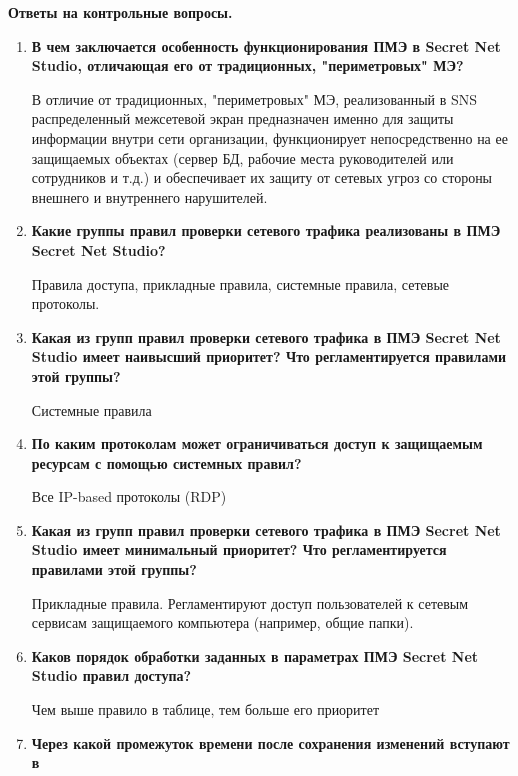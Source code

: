 \documentclass[a4paper,14pt]{extarticle}
\begin{document}
    \newpage
    \textbf{Ответы на контрольные вопросы.}
    \begin{enumerate}
        \singlespacing
        \item \textbf{В чем заключается особенность функционирования ПМЭ в Secret Net \linebreak Studio,
        отличающая его от традиционных, "периметровых" МЭ?}\par
        В отличие от традиционных, "периметровых" МЭ, реализованный в SNS \linebreak
        распределенный межсетевой экран предназначен именно для защиты \linebreak информации 
        внутри сети организации, функционирует непосредственно на ее защищаемых объектах 
        (сервер БД, рабочие места руководителей или сотрудников и т.д.) и обеспечивает 
        их защиту от сетевых угроз со стороны внешнего и внутреннего нарушителей.
        \item \textbf{Какие группы правил проверки сетевого трафика реализованы в ПМЭ Secret
        Net Studio?}\par
        Правила доступа, прикладные правила, системные правила, сетевые протоколы.
        \item \textbf{Какая из групп правил проверки сетевого трафика в ПМЭ Secret Net Studio
        имеет наивысший приоритет? Что регламентируется правилами этой \linebreak группы?}\par
        Системные правила
        \item \textbf{По каким протоколам может ограничиваться доступ к защищаемым \linebreak ресурсам
        с помощью системных правил?}\par
        Все IP-based протоколы (RDP)
        \item \textbf{Какая из групп правил проверки сетевого трафика в ПМЭ Secret Net Studio
        имеет минимальный приоритет? Что регламентируется правилами этой
        группы?}\par
        Прикладные правила. Регламентируют доступ пользователей к сетевым сервисам защищаемого компьютера (например, общие папки).
        \item \textbf{Каков порядок обработки заданных в параметрах ПМЭ Secret Net Studio
        правил доступа?}\par
        Чем выше правило в таблице, тем больше его приоритет
        \item \textbf{Через какой промежуток времени после сохранения изменений вступают в
}
\end{enumerate}
\end{document}
